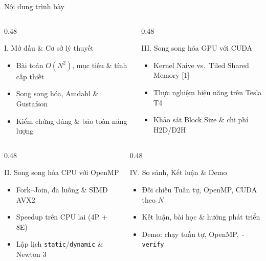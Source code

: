 \documentclass[aspectratio=169,11pt]{beamer}
\newcommand{\code}[1]{\texttt{\color{navy}#1}}
\begin{document}
\begin{frame}{Nội dung trình bày}
\begin{columns}[T]
\begin{column}{0.48\textwidth}
\begin{block}{I. Mở đầu \& Cơ sở lý thuyết}
\footnotesize
\begin{itemize}
\setlength{\itemsep}{1pt}
\item Bài toán $O(N^2)$, mục tiêu \& tính cấp thiết
\item Song song hóa, Amdahl \& Gustafson
\item Kiểm chứng đúng \& bảo toàn năng lượng
\end{itemize}
\end{block}
\end{column}
\begin{column}{0.48\textwidth}
\begin{block}{III. Song song hóa GPU với CUDA}
\footnotesize
\begin{itemize}
\setlength{\itemsep}{1pt}
\item Kernel Naive vs.\ Tiled Shared Memory [1]
\item Thực nghiệm hiệu năng trên Tesla T4
\item Khảo sát Block Size \& chi phí H2D/D2H
\end{itemize}
\end{block}
\end{column}
\end{columns}
\vspace{2pt}
\begin{columns}[T]
\begin{column}{0.48\textwidth}
\begin{block}{II. Song song hóa CPU với OpenMP}
\footnotesize
\begin{itemize}
\setlength{\itemsep}{1pt}
\item Fork--Join, đa luồng \& SIMD AVX2
\item Speedup trên CPU lai (4P + 8E)
\item Lập lịch \code{static}/\code{dynamic} \& Newton 3
\end{itemize}
\end{block}
\end{column}
\begin{column}{0.48\textwidth}
\begin{block}{IV. So sánh, Kết luận \& Demo}
\footnotesize
\begin{itemize}
\setlength{\itemsep}{1pt}
\item Đối chiếu Tuần tự, OpenMP, CUDA theo $N$
\item Kết luận, bài học \& hướng phát triển
\item Demo: chạy tuần tự, OpenMP, \code{-verify}
\end{itemize}
\end{block}
\end{column}
\end{columns}
\end{frame}
\end{document}
